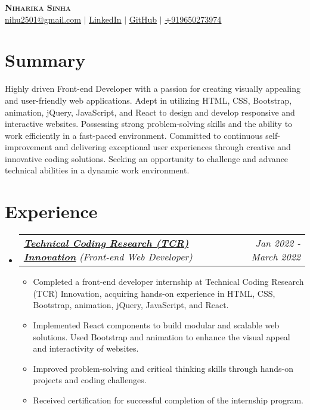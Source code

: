 \documentclass[letterpaper,11pt]{article}
\makeatletter
\newcommand{\resumeItem}[1]{
  \item\small{
    {#1 \vspace{-2pt}}
  }
}
\newcommand{\resumeSubSubheading}[2]{
    \item
    \begin{tabular*}{0.97\textwidth}{l@{\extracolsep{\fill}}r}
      \textit{\small#1} & \textit{\small #2} \\
    \end{tabular*}\vspace{-7pt}
}
\newcommand{\resumeSubHeadingListStart}{\begin{itemize}[leftmargin=0.15in, label={}]}
\newcommand{\resumeSubHeadingListEnd}{\end{itemize}}
\newcommand{\resumeItemListStart}{\begin{itemize}}
\newcommand{\resumeItemListEnd}{\end{itemize}\vspace{-5pt}}
\makeatother
\begin{document}

\begin{center}
    \textbf{\Huge \scshape Niharika Sinha} \\ \vspace{1pt}
    \href{mailto:nihu2501@gmail.com}{ \underline{nihu2501@gmail.com}} $|$  
    \href{https://linkedin.com/in/nihx25}{ \underline{LinkedIn}} $|$
    \href{https://github.com/nihx25}{ \underline{GitHub}} $|$
    \href{tel:+919650273974} { \underline{+919650273974}}
    
\end{center}

\section{Summary}
{Highly driven Front-end Developer with a passion for creating visually appealing and user-friendly web applications. Adept in utilizing HTML, CSS, Bootstrap, animation, jQuery, JavaScript, and React to design and develop responsive and interactive websites. Possessing strong problem-solving skills and the ability to work efficiently in a fast-paced environment. Committed to continuous self-improvement and delivering exceptional user experiences through creative and innovative coding solutions. Seeking an opportunity to challenge and advance technical abilities in a dynamic work environment.}

\section{Experience}
  \resumeSubHeadingListStart
   \resumeSubSubheading
    {\textbf{\href{https://verification.givemycertificate.com/v/94bfc238-5031-4eaa-8a45-5e6355310612}{Technical Coding Research (TCR) Innovation}} (Front-end Web Developer) }{Jan 2022 - March 2022}
    \resumeItemListStart
       \resumeItem{Completed a front-end developer internship at Technical Coding Research (TCR) Innovation, acquiring hands-on experience in HTML, CSS, Bootstrap, animation, jQuery, JavaScript, and React.}
       \resumeItem{Implemented React components to build modular and scalable web solutions. Used Bootstrap and animation to enhance the visual appeal and interactivity of websites.}
       \resumeItem{Improved problem-solving and critical thinking skills through hands-on projects and coding challenges.}
       \resumeItem{Received certification for successful completion of the internship program.}
    \resumeItemListEnd
   \resumeSubHeadingListEnd
\end{document}
